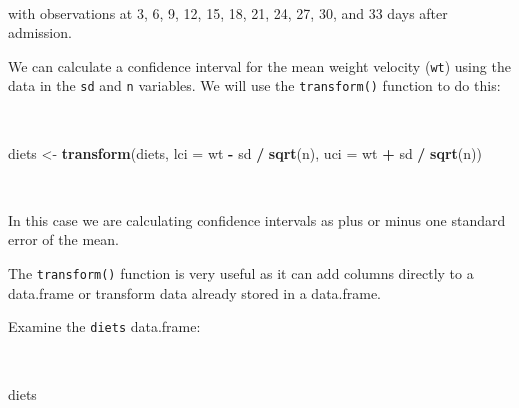 \documentclass[12pt,a4paper]{book}
\newenvironment{Shaded}{\begin{snugshade}}{\end{snugshade}}
\newcommand{\KeywordTok}[1]{\textcolor[rgb]{0.13,0.29,0.53}{\textbf{#1}}}
\newcommand{\DataTypeTok}[1]{\textcolor[rgb]{0.13,0.29,0.53}{#1}}
\newcommand{\StringTok}[1]{\textcolor[rgb]{0.31,0.60,0.02}{#1}}
\newcommand{\OperatorTok}[1]{\textcolor[rgb]{0.81,0.36,0.00}{\textbf{#1}}}
\newcommand{\NormalTok}[1]{#1}
\theoremstyle{definition}
\theoremstyle{definition}
\theoremstyle{definition}
\theoremstyle{remark}
\begin{document}
~

with observations at 3, 6, 9, 12, 15, 18, 21, 24, 27, 30, and 33 days
after admission.

We can calculate a confidence interval for the mean weight velocity
(\texttt{wt}) using the data in the \texttt{sd} and \texttt{n}
variables. We will use the \texttt{transform()} function to do this:

~

\begin{Shaded}
\begin{Highlighting}[]
\NormalTok{diets <-}\StringTok{ }\KeywordTok{transform}\NormalTok{(diets, }\DataTypeTok{lci =}\NormalTok{ wt }\OperatorTok{-}\StringTok{ }\NormalTok{sd }\OperatorTok{/}\StringTok{ }\KeywordTok{sqrt}\NormalTok{(n), }\DataTypeTok{uci =}\NormalTok{ wt }\OperatorTok{+}\StringTok{ }\NormalTok{sd }\OperatorTok{/}\StringTok{ }\KeywordTok{sqrt}\NormalTok{(n))}
\end{Highlighting}
\end{Shaded}

~

In this case we are calculating confidence intervals as plus or minus
one standard error of the mean.

The \texttt{transform()} function is very useful as it can add columns
directly to a data.frame or transform data already stored in a
data.frame.

\newpage

Examine the \texttt{diets} data.frame:

~

\begin{Shaded}
\begin{Highlighting}[]
\NormalTok{diets}
\end{Highlighting}
\end{Shaded}
\end{document}
